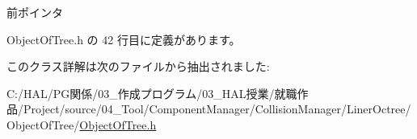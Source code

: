 前ポインタ 



 Object\+Of\+Tree.\+h の 42 行目に定義があります。



このクラス詳解は次のファイルから抽出されました\+:\begin{DoxyCompactItemize}
\item 
C\+:/\+H\+A\+L/\+P\+G関係/03\+\_\+作成プログラム/03\+\_\+\+H\+A\+L授業/就職作品/\+Project/source/04\+\_\+\+Tool/\+Component\+Manager/\+Collision\+Manager/\+Liner\+Octree/\+Object\+Of\+Tree/\mbox{\hyperlink{_object_of_tree_8h}{Object\+Of\+Tree.\+h}}\end{DoxyCompactItemize}
